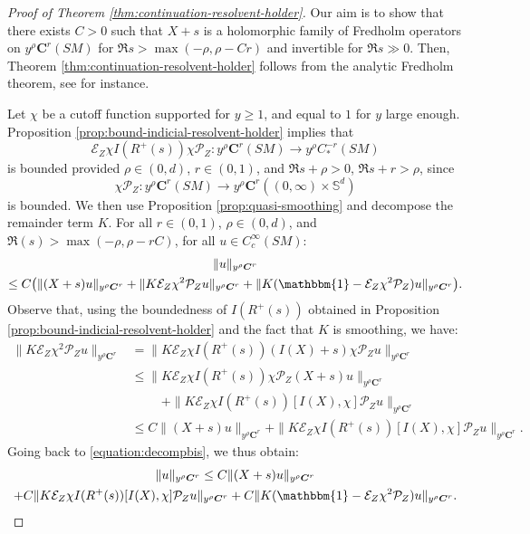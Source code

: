 \documentclass[JEP,XML,SOM,Unicode,NoFloatCountersInSection]{cedram}
\newcommand{\bC}{\boldsymbol{C}}
\newcommand{\Ss}{\mathbb{S}}
\theoremstyle{plain}
\theoremstyle{definition}
\begin{document}
\begin{proof}[Proof of Theorem \ref{thm:continuation-resolvent-holder}]
Our aim is to show that there exists $C > 0$ such that $X+s$ is a holomorphic family of Fredholm operators on $y^\rho \bC^r(SM)$ for $\Re s > \max(-\rho,\rho-Cr)$ and invertible for $\Re s \gg 0$. Then, Theorem \ref{thm:continuation-resolvent-holder} follows from the analytic Fredholm theorem, see \cite[App.\,D]{Zworski-book} for instance.

Let $\chi$ be a cutoff function supported for $y\geq 1$, and equal to $1$ for $y$ large enough. Proposition \ref{prop:bound-indicial-resolvent-holder} implies that
\[
\mathcal{E}_Z\chi I(R^+(s)) \chi\mathcal{P}_Z : y^\rho \bC^r(SM) \to y^\rho C^{-r}_*(SM)
\]
is bounded provided $\rho \in (0,d)$, $r\in (0,1)$, and $\Re s + \rho >0$, $\Re s + r > \rho$, since
\[
\chi \mathcal{P}_Z : y^\rho \bC^r(SM) \to y^\rho \bC^r((0,\infty) \times \Ss^d)
\]
is bounded. We then use Proposition \ref{prop:quasi-smoothing} and decompose the remainder term $K$. For all $r \in (0,1)$, $\rho \in (0,d)$, and $\Re(s) > \max(-\rho,\rho-rC)$, for all $u \in C^\infty_{c}(SM)$:
\begin{multline}
\label{equation:decompbis}
\|u\|_{y^\rho \bC^r}\\
\leq C \bigl(\| (X+s)u\|_{y^\rho\bC^r} + \| K \mathcal{E}_Z\chi^2 \mathcal{P}_Z u\|_{y^\rho\bC^r} + \|K(\mathbbm{1}-\mathcal{E}_Z\chi^2\mathcal{P}_Z)u\|_{y^\rho\bC^r}\bigr).
\end{multline}
Observe that, using the boundedness of $I(R^+(s))$ obtained in Proposition \ref{prop:bound-indicial-resolvent-holder} and the fact that $K$ is smoothing, we have:
\[
\begin{split}
\| K \mathcal{E}_Z\chi^2 \mathcal{P}_Z u\|_{y^\rho\bC^r} & = \| K \mathcal{E}_Z\chi I(R^+(s)) (I(X)+s) \chi \mathcal{P}_Z u\|_{y^\rho\bC^r} \\
& \leq \| K \mathcal{E}_Z\chi I(R^+(s)) \chi \mathcal{P}_Z (X+s)u\|_{y^\rho\bC^r} \\
& \hspace{1cm}+ \| K \mathcal{E}_Z\chi I(R^+(s)) [I(X), \chi] \mathcal{P}_Z u\|_{y^\rho\bC^r} \\
& \leq C \|(X+s)u\|_{y^\rho\bC^r}+\| K \mathcal{E}_Z\chi I(R^+(s)) [I(X), \chi] \mathcal{P}_Z u\|_{y^\rho\bC^r}.
\end{split}
\]
Going back to \eqref{equation:decompbis}, we thus obtain:
\begin{multline}\label{equation:comp}
\|u\|_{y^\rho \bC^r}\leq C \| (X+s)u\|_{y^\rho\bC^r} \\
+ C\| K \mathcal{E}_Z\chi I(R^+(s)) [I(X), \chi] \mathcal{P}_Z u\|_{y^\rho\bC^r} + C\|K(\mathbbm{1}-\mathcal{E}_Z\chi^2\mathcal{P}_Z)u\|_{y^\rho\bC^r}.
\end{multline}


\end{proof}
\end{document}
